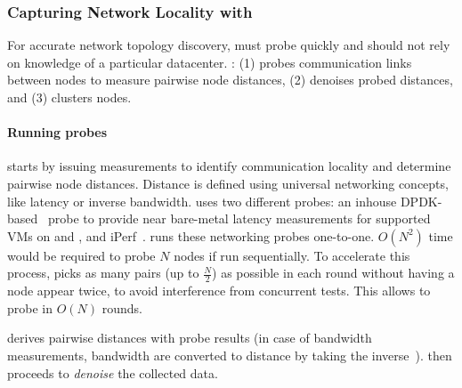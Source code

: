 \subsubsection{Capturing Network Locality with \marcopolo}
\label{sec:marcopolo}
For accurate network topology discovery, \marcopolo must probe quickly and should not rely on knowledge of a particular datacenter. \marcopolo: (1) probes communication links between nodes to measure pairwise node distances, (2) denoises probed distances, and (3) clusters nodes.

\paragraph{Running \marcopolo probes}

\marcopolo starts by issuing measurements to identify communication locality and determine pairwise node distances. Distance is defined using universal networking concepts, like latency or inverse bandwidth. \marcopolo uses two different probes: an inhouse DPDK-based~\cite{HomeDPDK74:online} probe to provide near bare-metal latency measurements for supported VMs on \azure and \ectwo, and iPerf~\cite{iPerfThe0:online}. \marcopolo runs these networking probes one-to-one. $O(N^2)$ time would be required to probe $N$ nodes if run sequentially. To accelerate this process, \marcopolo picks as many pairs (up to $\frac{N}{2}$) as possible in each round without having a node appear twice, to avoid interference from concurrent tests. This allows \marcopolo to probe in $O(N)$ rounds.


\marcopolo derives pairwise distances with probe results (in case of bandwidth measurements, bandwidth are converted to distance by taking the inverse~\cite{affinity2Distance}). \marcopolo then proceeds to \textit{denoise} the collected data. %

